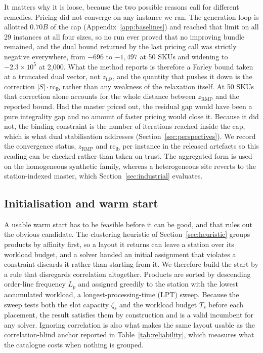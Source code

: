 \documentclass[]{interact}
\begin{document}
It matters why it is loose, because the two possible reasons call for different remedies. Pricing did not converge on any instance we ran. The generation loop is allotted $0.70B$ of the cap (Appendix~\ref{app:baselines}) and reached that limit on all 29 instances at all four sizes, so no run ever proved that no improving bundle remained, and the dual bound returned by the last pricing call was strictly negative everywhere, from $-696$ to $-1{,}497$ at 50 SKUs and widening to $-2.3\times10^{5}$ at 2,000. What the method reports is therefore a Farley bound taken at a truncated dual vector, not $z_{\mathrm{LP}}$, and the quantity that pushes it down is the correction $|S|\cdot\mathrm{rc}_{\mathrm{lb}}$ rather than any weakness of the relaxation itself. At 50 SKUs that correction alone accounts for the whole distance between $z_{\mathrm{RMP}}$ and the reported bound. Had the master priced out, the residual gap would have been a pure integrality gap and no amount of faster pricing would close it. Because it did not, the binding constraint is the number of iterations reached inside the cap, which is what dual stabilisation addresses (Section~\ref{sec:perspectives}). We record the convergence status, $z_{\mathrm{RMP}}$ and $\mathrm{rc}_{\mathrm{lb}}$ per instance in the released artefacts so this reading can be checked rather than taken on trust. The aggregated form is used on the homogeneous synthetic family, whereas a heterogeneous site reverts to the station-indexed master, which Section~\ref{sec:industrial} evaluates.

\subsection{Initialisation and warm start}\label{sec:init}
A usable warm start has to be feasible before it can be good, and that rules out the obvious candidate. The clustering heuristic of Section~\ref{sec:heuristic} groups products by affinity first, so a layout it returns can leave a station over its workload budget, and a solver handed an initial assignment that violates a constraint discards it rather than starting from it. We therefore build the start by a rule that disregards correlation altogether. Products are sorted by descending order-line frequency $L_p$ and assigned greedily to the station with the lowest accumulated workload, a longest-processing-time (LPT) sweep. Because the sweep tests both the slot capacity $\zeta_s$ and the workload budget $T_s$ before each placement, the result satisfies them by construction and is a valid incumbent for any solver. Ignoring correlation is also what makes the same layout usable as the correlation-blind anchor reported in Table~\ref{tab:reliability}, which measures what the catalogue costs when nothing is grouped.
\end{document}
